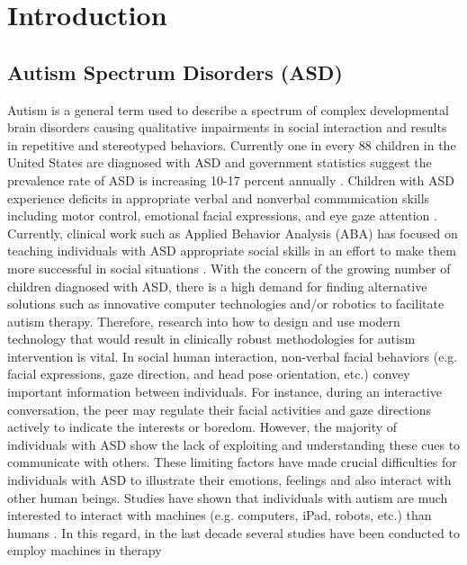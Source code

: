 \chapter{Introduction}



\section{Autism Spectrum Disorders (ASD)}
Autism is a general term used to describe a spectrum of complex developmental
brain disorders causing qualitative impairments in social interaction and results in
repetitive and stereotyped behaviors. Currently one in every 88 children in the United
States are diagnosed with ASD and government statistics suggest the prevalence rate of
ASD is increasing 10-17 percent annually \cite{Fetch2002}. Children with ASD experience deficits in
appropriate verbal and nonverbal communication skills including motor control, emotional
facial expressions, and eye gaze attention \cite{RobotPlaymate2002}. Currently, clinical work such as Applied
Behavior Analysis (ABA) \cite{RollingRobot2002, MobileRobotic2002} has focused on teaching individuals with ASD
appropriate social skills in an effort to make them more successful in social situations \cite{Behavioral1964}.
With the concern of the growing number of children diagnosed with ASD, there is a high
demand for finding alternative solutions such as innovative computer technologies and/or
robotics to facilitate autism therapy. Therefore, research into how to design and use modern
technology that would result in clinically robust methodologies for autism intervention is
vital.
In social human interaction, non-verbal facial behaviors (e.g. facial expressions,
gaze direction, and head pose orientation, etc.) convey important information between
individuals. For instance, during an interactive conversation, the peer may regulate their
facial activities and gaze directions actively to indicate the interests or boredom. However,
the majority of individuals with ASD show the lack of exploiting and understanding these
cues to communicate with others. These limiting factors have made crucial difficulties for
individuals with ASD to illustrate their emotions, feelings and also interact with other
human beings. Studies have shown that individuals with autism are much interested to
interact with machines (e.g. computers, iPad, robots, etc.) than humans \cite{SocialInteract2003}. In this regard,
in the last decade several studies have been conducted to employ machines in therapy
